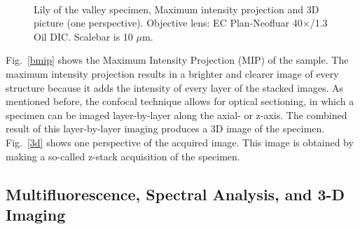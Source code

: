 \begin{figure}[h]
\centering
{}\hspace{0.1em}
\\
\caption{Lily of the valley specimen, Maximum intensity projection and 3D picture (one perspective). 
Objective lens: EC Plan-Neofluar 40$\times$/1.3 Oil DIC. 
Scalebar is 10 $\mu$m.} 
\label{fig:LSMmip3d}
\end{figure}

Fig.~\ref{bmip} shows the Maximum Intensity Projection (MIP) of the sample. 
The maximum intensity projection results in a brighter and clearer image of every structure because it adds the intensity of every layer of the stacked images. 
As mentioned before, the confocal technique allows for optical sectioning, in which a specimen can be imaged layer-by-layer along the axial- or z-axis. 
The combined result of this layer-by-layer imaging produces a 3D image of the specimen. 
Fig.~\ref{3d} shows one perspective of the acquired image. 
This image is obtained by making a so-called z-stack acquisition of the specimen. 

\subsection{Multifluorescence, Spectral Analysis, and 3-D Imaging}

